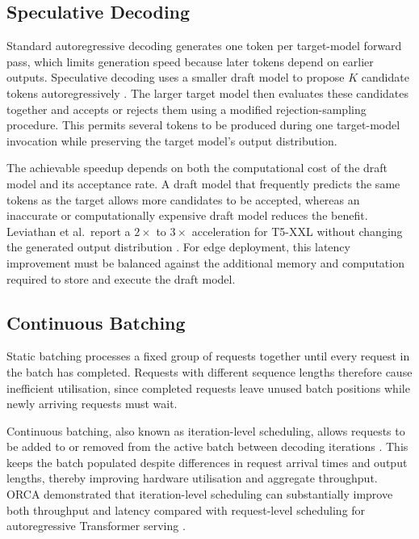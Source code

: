 \subsection{Speculative Decoding}
\label{sec:speculative-decoding}

Standard autoregressive decoding generates one token per target-model forward
pass, which limits generation speed because later tokens depend on earlier
outputs. Speculative decoding uses a smaller draft model to propose \(K\)
candidate tokens autoregressively \cite{leviathan2023speculative}. The larger
target model then evaluates these candidates together and accepts or rejects
them using a modified rejection-sampling procedure. This permits several tokens
to be produced during one target-model invocation while preserving the target
model's output distribution.

The achievable speedup depends on both the computational cost of the draft
model and its acceptance rate. A draft model that frequently predicts the same
tokens as the target allows more candidates to be accepted, whereas an
inaccurate or computationally expensive draft model reduces the benefit.
Leviathan et al.\ report a \(2\times\) to \(3\times\) acceleration for T5-XXL
without changing the generated output distribution
\cite{leviathan2023speculative}. For edge deployment, this latency improvement
must be balanced against the additional memory and computation required to
store and execute the draft model.

\subsection{Continuous Batching}
\label{sec:continuous-batching}

Static batching processes a fixed group of requests together until every
request in the batch has completed. Requests with different sequence lengths
therefore cause inefficient utilisation, since completed requests leave unused
batch positions while newly arriving requests must wait.

Continuous batching, also known as iteration-level scheduling, allows requests
to be added to or removed from the active batch between decoding iterations
\cite{yu2022orca}. This keeps the batch populated despite differences in
request arrival times and output lengths, thereby improving hardware utilisation
and aggregate throughput. ORCA demonstrated that iteration-level scheduling can
substantially improve both throughput and latency compared with request-level
scheduling for autoregressive Transformer serving \cite{yu2022orca}.

